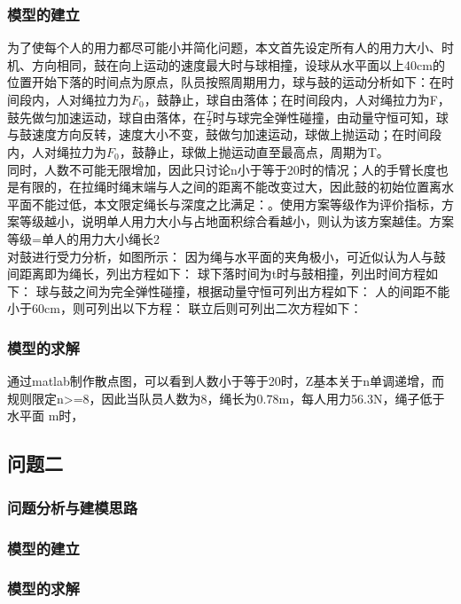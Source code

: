 \documentclass[withoutpreface,bwprint]{cumcmthesis} %
\begin{document}
	\subsubsection{模型的建立}
为了使每个人的用力都尽可能小并简化问题，本文首先设定所有人的用力大小、时机、方向相同，鼓在向上运动的速度最大时与球相撞，设球从水平面以上40cm的位置开始下落的时间点为原点，队员按照周期用力，球与鼓的运动分析如下：在时间段内，人对绳拉力为$F_0$，鼓静止，球自由落体；在时间段内，人对绳拉力为F，鼓先做匀加速运动，球自由落体，在$\frac{T}{2}$时与球完全弹性碰撞，由动量守恒可知，球与鼓速度方向反转，速度大小不变，鼓做匀加速运动，球做上抛运动；在时间段内，人对绳拉力为$F_0$，鼓静止，球做上抛运动直至最高点，周期为T。
\\
同时，人数不可能无限增加，因此只讨论n小于等于20时的情况；人的手臂长度也是有限的，在拉绳时绳末端与人之间的距离不能改变过大，因此鼓的初始位置离水平面不能过低，本文限定绳长与深度之比满足：。使用方案等级作为评价指标，方案等级越小，说明单人用力大小与占地面积综合看越小，则认为该方案越佳。方案等级=单人的用力大小绳长2
\\
对鼓进行受力分析，如图所示：
因为绳与水平面的夹角极小，可近似认为人与鼓间距离即为绳长，列出方程如下：
球下落时间为t时与鼓相撞，列出时间方程如下：
球与鼓之间为完全弹性碰撞，根据动量守恒可列出方程如下：
人的间距不能小于60cm，则可列出以下方程：
联立后则可列出二次方程如下：

	\subsubsection{模型的求解}
通过matlab制作散点图，可以看到人数小于等于20时，Z基本关于n单调递增，而规则限定n>=8，因此当队员人数为8，绳长为0.78m，每人用力56.3N，绳子低于水平面 m时，

\subsection{问题二}
	\subsubsection{问题分析与建模思路}


	\subsubsection{模型的建立}


	\subsubsection{模型的求解}
\end{document}
